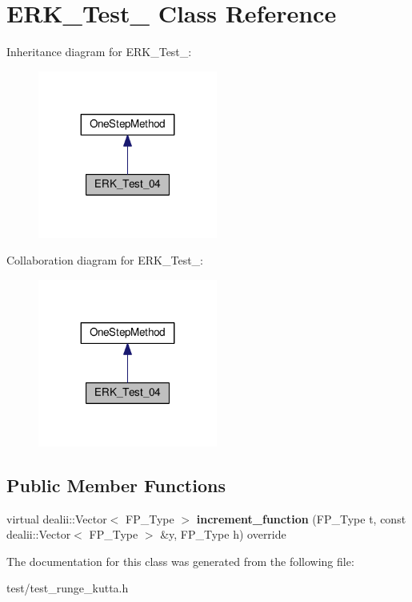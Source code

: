 \hypertarget{classERK__Test__04}{}\section{E\+R\+K\+\_\+\+Test\+\_ Class Reference}
\label{classERK__Test__04}


Inheritance diagram for E\+R\+K\+\_\+\+Test\+\_\+:
\nopagebreak
\begin{figure}[H]
\begin{center}
\leavevmode
\includegraphics[width=167pt]{classERK__Test__04__inherit__graph}
\end{center}
\end{figure}


Collaboration diagram for E\+R\+K\+\_\+\+Test\+\_\+:
\nopagebreak
\begin{figure}[H]
\begin{center}
\leavevmode
\includegraphics[width=167pt]{classERK__Test__04__coll__graph}
\end{center}
\end{figure}
\subsection*{Public Member Functions}
\begin{DoxyCompactItemize}
\item 
\mbox{\label{classERK__Test__04_af4dae610075271a689c9442bd160cd33}} 
virtual dealii\+::\+Vector$<$ F\+P\+\_\+\+Type $>$ {\bfseries increment\+\_\+function} (F\+P\+\_\+\+Type t, const dealii\+::\+Vector$<$ F\+P\+\_\+\+Type $>$ \&y, F\+P\+\_\+\+Type h) override
\end{DoxyCompactItemize}


The documentation for this class was generated from the following file\+:\begin{DoxyCompactItemize}
\item 
test/test\+\_\+runge\+\_\+kutta.\+h\end{DoxyCompactItemize}
